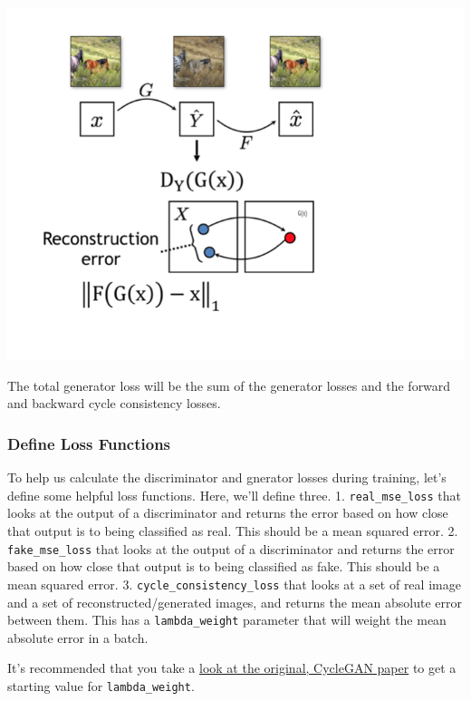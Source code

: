 \includegraphics[width=1\linewidth]{img//genAdvNet//image2image/reconstruction_error.png}

The total generator loss will be the sum of the generator losses and the
forward and backward cycle consistency losses.

\subsubsection{Define Loss Functions}

To help us calculate the discriminator and gnerator losses during
training, let's define some helpful loss functions. Here, we'll define
three. 1. \lstinline{real_mse_loss} that looks at the
output of a discriminator and returns the error based on how close that
output is to being classified as real. This should be a mean squared
error. 2. \lstinline{fake_mse_loss} that looks at the
output of a discriminator and returns the error based on how close that
output is to being classified as fake. This should be a mean squared
error. 3. \lstinline{cycle_consistency_loss} that looks
at a set of real image and a set of reconstructed/generated images, and
returns the mean absolute error between them. This has a
\lstinline{lambda_weight} parameter that will weight the
mean absolute error in a batch.

It's recommended that you take a
\href{https://arxiv.org/pdf/1703.10593.pdf}{look at the original,
CycleGAN paper} to get a starting value for
\lstinline{lambda_weight}.

